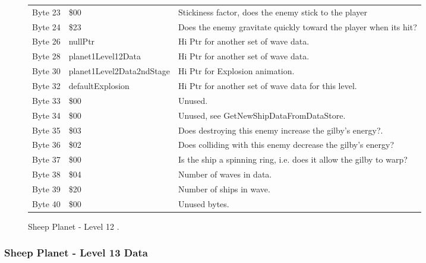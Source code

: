 \begin{figure}[H]
{\begin{adjustbox}{width=12cm}
\begin{tabular}{lll}
 Byte 23 & \$00                       & Stickiness factor, does the enemy stick to the player              \\
 Byte 24 & \$23                       & Does the enemy gravitate quickly toward the player when its hit?   \\
 Byte 26 & nullPtr                   & Hi Ptr for another set of wave data.                               \\
 Byte 28 & planet1Level12Data        & Hi Ptr for another set of wave data.                               \\
 Byte 30 & planet1Level2Data2ndStage & Hi Ptr for Explosion animation.                                    \\
 Byte 32 & defaultExplosion          & Hi Ptr for another set of wave data for this level.                \\
 Byte 33 & \$00                       & Unused.                                                            \\
 Byte 34 & \$00                       & Unused, see GetNewShipDataFromDataStore.                           \\
 Byte 35 & \$03                       & Does destroying this enemy increase the gilby's energy?.           \\
 Byte 36 & \$02                       & Does colliding with this enemy decrease the gilby's energy?        \\
 Byte 37 & \$00                       & Is the ship a spinning ring, i.e. does it allow the gilby to warp? \\
 Byte 38 & \$04                       & Number of waves in data.                                           \\
 Byte 39 & \$20                       & Number of ships in wave.                                           \\
 Byte 40 & \$00                       & Unused bytes.                                                      \\
\bottomrule
\end{tabular}

  \end{adjustbox}

  }\caption*{Sheep Planet - Level 12
.}
\end{figure}

\clearpage
\subsubsection{Sheep Planet - Level 13 Data}

